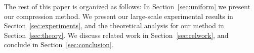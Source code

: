 The rest of this paper is organized as follows: In Section~\ref{sec:uniform} we present our compression method. We present our large-scale experimental results in Section~\ref{sec:experiments}, and the theoretical analysis for our method in Section~\ref{sec:theory}. We discuss related work in Section~\ref{sec:relwork}, and conclude in Section~\ref{sec:conclusion}.
